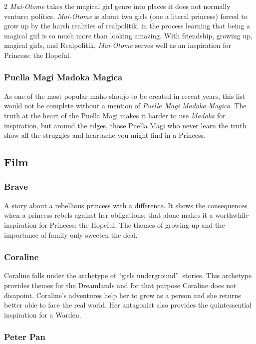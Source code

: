 \begin{multicols}{2}
\textit{Mai-Otome} takes the magical girl genre into places it does not normally venture: politics. \textit{Mai-Otome} is about two girls (one a literal princess) forced to grow up by the harsh realities of realpolitik, in the process learning that being a magical girl is so much more than looking amazing. With friendship, growing up, magical girls, and Realpolitik, \textit{Mai-Otome} serves well as an inspiration for Princess: the Hopeful. 

\subsubsection*{Puella Magi Madoka Magica}

As one of the most popular maho shoujo to be created in recent years, this list would not be complete without a mention of \textit{Puella Magi Madoka Magica}. The truth at the heart of the Puella Magi makes it harder to use \textit{Madoka} for inspiration, but around the edges, those Puella Magi who never learn the truth show all the struggles and heartache you might find in a Princess. 

\subsection*{Film}

\subsubsection*{Brave} 

A story about a rebellious princess with a difference. It shows the consequences when a princess rebels against her obligations; that alone makes it a worthwhile inspiration for Princess: the Hopeful. The themes of growing up and the importance of family only sweeten the deal. 

\subsubsection*{Coraline}

Coraline falls under the archetype of \textquotedblleft girls underground\textquotedblright\, stories. This archetype provides themes for the Dreamlands and for that purpose Coraline does not disapoint. Coraline's adventures help her to grow as a person and she returns better able to face the real world. Her antagonist also provides the quintessential inspiration for a Warden. 

\subsubsection*{Peter Pan}


\end{multicols}
